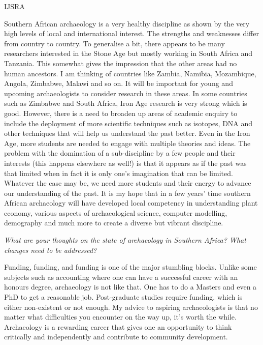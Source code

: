 \begin{labeling}{IJSRA}
\item[SC] Southern African archaeology is a very healthy discipline as shown by the very high levels of local and international interest. The strengths and weaknesses differ from country to country. To generalise a bit, there appears to be many researchers interested in the Stone Age but mostly working in South Africa and Tanzania. This somewhat gives the impression that the other areas had no human ancestors. I am thinking of countries like Zambia, Namibia, Mozambique, Angola, Zimbabwe, Malawi and so on. It will be important for young and upcoming archaeologists to consider research in these areas. In some countries such as Zimbabwe and South Africa, Iron Age research is very strong which is good. However, there is a need to broaden up areas of academic enquiry to include the deployment of more scientific techniques such as isotopes, DNA and other techniques that will help us understand the past better. Even in the Iron Age, more students are needed to engage with multiple theories and ideas. The problem with the domination of a sub-discipline by a few people and their interests (this happens elsewhere as well!) is that it appears as if the past was that limited when in fact it is only one’s imagination that can be limited. Whatever the case may be, we need more students and their energy to advance our understanding of the past. It is my hope that in a few years’ time southern African archaeology will have developed local competency in understanding plant economy, various aspects of archaeological science, computer modelling, demography and much more to create a diverse but vibrant discipline.


\item[IJSRA] \emph{What are your thoughts on the state of archaeology in Southern Africa? What changes need to be addressed?}
	
\item[SC] Funding, funding, and funding is one of the major stumbling blocks. Unlike some subjects such as accounting where one can have a successful career with an honours degree, archaeology is not like that. One has to do a Masters and even a PhD to get a reasonable job. Post-graduate studies require funding, which is either non-existent or not enough. My advice to aspiring archaeologists is that no matter what difficulties you encounter on the way up, it’s worth the while. Archaeology is a rewarding career that gives one an opportunity to think critically and independently and contribute to community development.



\end{labeling}
